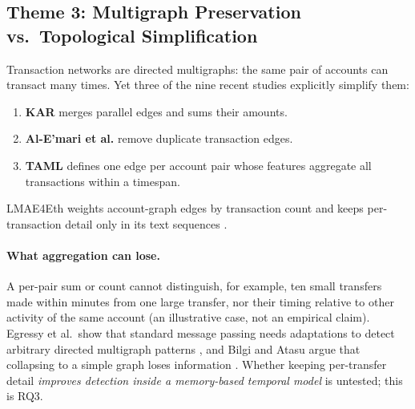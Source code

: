 \documentclass[11pt,a4paper]{article}
\begin{document}
\subsection{Theme 3: Multigraph Preservation vs.\ Topological Simplification}
Transaction networks are directed multigraphs: the same pair of accounts can transact many times. Yet three of the nine recent studies explicitly simplify them:
\begin{enumerate}[leftmargin=*]
    \item \textbf{KAR} \cite{tian2025kar} merges parallel edges and sums their amounts.
    \item \textbf{Al-E'mari et al.} \cite{alemari2026explainable} remove duplicate transaction edges.
    \item \textbf{TAML} \cite{rico2026taml} defines one edge per account pair whose features aggregate all transactions within a timespan.
\end{enumerate}
LMAE4Eth weights account-graph edges by transaction count and keeps per-transaction detail only in its text sequences \cite{jia2025lmae4eth}.

\paragraph{What aggregation can lose.} A per-pair sum or count cannot distinguish, for example, ten small transfers made within minutes from one large transfer, nor their timing relative to other activity of the same account (an illustrative case, not an empirical claim). Egressy et al.\ show that standard message passing needs adaptations to detect arbitrary directed multigraph patterns \cite{egressy2024multigraph}, and Bilgi and Atasu argue that collapsing to a simple graph loses information \cite{bilgi2026mega}. Whether keeping per-transfer detail \emph{improves detection inside a memory-based temporal model} is untested; this is RQ3.
\end{document}
